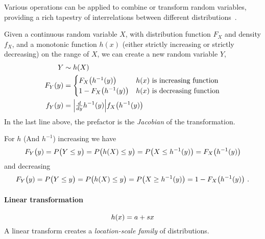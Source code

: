 

\clearpage
{}

Various operations can be applied to combine or transform random variables, providing a rich tapestry of interrelations between different distributions~\cite{Springer1979a, Devroye1986}.


\label{transforms}


Given a continuous random variable $X$, with distribution function $F_X$ and density $f_X$, and a monotonic function $h(x)$ (either strictly increasing or strictly decreasing) on the range of $X$, we can create a new random variable $Y$, 
\begin{align*}
Y &\sim h(X) \checked \\
F_Y(y) &= \begin{cases}
	F_X\bigl( h^{-1}(y) \bigr) & \text{$h(x)$ is increasing function} \checked \\ 
	1- F_X\bigl( h^{-1}(y) \bigr) &  \text{$h(x)$ is decreasing function} \checked
	\end{cases}
	\\
f_Y(y) &= \Left|\tfrac{d}{dy}h^{-1}(y)\Right| f_X\bigl( h^{-1}(y) \bigr) \checked
\end{align*}
In the last line above, the prefactor is the {\em Jacobian} of the transformation. 

For $h$ (And $h^{-1}$) increasing we have
\[
F_Y\bigl(y) = P\bigl(Y\leq y\bigr) = P\bigl(h(X) \leq y\bigr) = P\bigl(X \leq h^{-1}(y) \bigr) =
 F_X\bigl( h^{-1}(y) \bigr) 
\notag
\]
and decreasing
\[
F_Y\bigl(y) = P\bigl(Y\leq y\bigr) = P\bigl(h(X) \leq y\bigr) = P\bigl(X \geq h^{-1}(y) \bigr) =
 1- F_X\bigl( h^{-1}(y) \bigr) 
\notag \ .
\]


\paragraph*{Linear transformation}
\[
h(x) = a+ s x 
\notag
\]
A linear transform creates a {\sl location-scale family} of distributions. 



